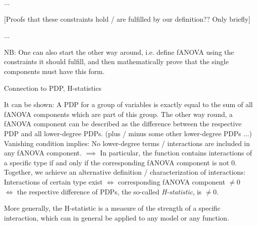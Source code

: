 \documentclass[11pt,compress,t,notes=noshow, aspectratio=169, xcolor=table]{beamer}
\begin{document}
\begin{frame}{...}

    [Proofs that these constraints hold / are fulfilled by our definition?? Only briefly]
    
\end{frame}

\begin{frame}{...}

    NB: One can also start the other way around, i.e. define fANOVA using the constraints it should fulfill, and then mathematically prove that the single components must have this form.
    
\end{frame}

\begin{frame}{Connection to PDP, H-statistics}

    It can be shown: A PDP for a group of variables is exactly equal to the sum of all fANOVA components which are part of this group.
    The other way round, a fANOVA component can be described as the difference between the respective PDP and all lower-degree PDPs. (plus / minus some other lower-degree PDPs ...)
    \\
    Vanishing condition implies: No lower-degree terms / interactions are included in any fANOVA component.
    \(\implies\)
    In particular, the function contains interactions of a specific type if and only if the corresponding fANOVA component is not 0.
    \\
    Together, we achieve an alternative definition / characterization of interactions:
    Interactions of certain type exist \(\iff\) corresponding fANOVA component \(\neq 0\) \(\iff\) the respective difference of PDPs, the so-called \textit{H-statistic}, is \(\neq 0\).

    More generally, the H-statistic is a measure of the strength of a specific interaction, which can in general be applied to any model or any function.
     
\end{frame}










\endlecture
\end{document}

